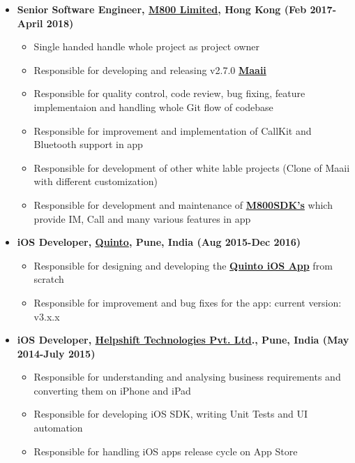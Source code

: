 \documentclass[letterpaper,11pt]{article}
\newcommand{\resitem}[1]{\item #1 \vspace{-2pt}}
\begin{document}
\begin{itemize}

\resitem {{\bfseries Senior Software Engineer, \href{http://www.m800.com} {M800 Limited}, Hong Kong (Feb 2017-April 2018)}}
		{ \footnotesize
		\begin{itemize}
			\resitem{Single handed handle whole project as project owner}
			\resitem{Responsible for developing and releasing v2.7.0  \href{https://itunes.apple.com/hk/app/id488051175}{\bfseries Maaii}}
			\resitem{Responsible for quality control, code review, bug fixing, feature implementaion and handling whole Git flow of codebase}
			\resitem{Responsible for improvement and implementation of CallKit and Bluetooth support in app}
			\resitem{Responsible for development of other white lable projects (Clone of Maaii with different customization)}
			\resitem{Responsible for development and maintenance of \href{https://developer.m800.com/}{\bfseries M800SDK's}  which provide IM, Call and many various features in app}
		\end{itemize}
		}
\resitem {{\bfseries iOS Developer, \href{http://quintoapp.com} {Quinto}, Pune, India (Aug 2015-Dec 2016)}}
		{ \footnotesize
		\begin{itemize}
			\resitem{Responsible for designing and developing the \href{https://itunes.apple.com/in/app/id912305961}{\bfseries Quinto iOS App} from scratch}
			\resitem{Responsible for improvement and bug fixes for the app: current version: v3.x.x}
		\end{itemize}
		}
\resitem {{\bfseries iOS Developer, \href{https://helpshift.com}{\bfseries Helpshift Technologies Pvt. Ltd}., Pune, India (May 2014-July 2015)}}
		{ \footnotesize
		\begin{itemize}
			\resitem{Responsible for understanding and analysing business requirements and converting them on iPhone and iPad}
			\resitem{Responsible for developing iOS SDK, writing Unit Tests and UI automation}
			\resitem{Responsible for handling iOS apps release cycle on App Store}
		\end{itemize}
		}
\end{itemize}  %
\end{document}
